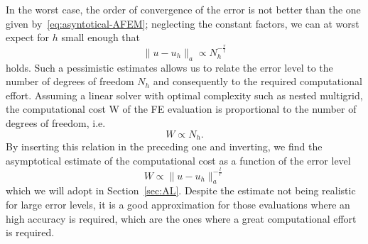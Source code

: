 In the worst case, the order of convergence of the error is not better than the one given by~\eqref{eq:asyntotical-AFEM}; neglecting the constant factors, we can at worst expect for $h$ small enough that
\[
    \| u - u_h \|_a \propto N_h^{-\frac{r}{l}}
\]
holds.
Such a pessimistic estimates allows us to relate the error level to the number of degrees of freedom $N_h$ and consequently to the required computational effort.
Assuming a linear solver with optimal complexity such as nested multigrid, the computational cost W of the FE evaluation is proportional to the number of degrees of freedom, i.e. 
\[
    W \propto N_h.
\]
By inserting this relation in the preceding one and inverting, we find the asymptotical estimate of the computational cost as a function of the error level
\begin{equation}\label{eq:FE-cost}
    W \propto \| u - u_h \|_a^{-\frac{l}{r}}
\end{equation}
which we will adopt in Section~\ref{sec:AL}.
Despite the estimate not being realistic for large error levels, it is a good approximation for those evaluations where an high accuracy is required, which are the ones where a great computational effort is required.